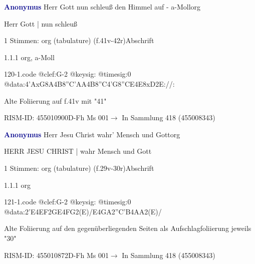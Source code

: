 \documentclass[twocolumn, 12pt]{book}
\begin{document}
\par \vspace{16pt} \textcolor{darkblue}{\textbf{Anonymus  }}\hfillplus{\textbf{[120]}}\newline Herr Gott nun schleuß den Himmel auf - a-Moll\newline org
\par \begin{itshape}[f.41v, at left:] Herr Gott | nun schleuß\end{itshape} 
\par \textcolor{darkblue}{}  1 Stimmen: org (tabulature)  (f.41v-42r)\newline Abschrift
\par 1.1.1  org, a-Moll  
\begin{filecontents*}{120-1.code}
@clef:G-2
@keysig:
@timesig:0
@data:4'AxG8A4B8''C{'AA}4B8''C4'G8''CE4E8xD2E://:
\end{filecontents*}
\newline %
\par Alte Foliierung auf f.41v mit "41"
\par RISM-ID: 455010900\newline D-Fh  Ms 001\newline $\rightarrow$ In Sammlung 418 (455008343)
      
\par \vspace{16pt} \textcolor{darkblue}{\textbf{Anonymus  }}\hfillplus{\textbf{[121]}}\newline Herr Jesu Christ wahr' Mensch und Gott\newline org
\par \begin{itshape}[f.29v, at left:] HERR JESU CHRIST | wahr Mensch und Gott\end{itshape} 
\par \textcolor{darkblue}{}  1 Stimmen: org (tabulature)  (f.29v-30r)\newline Abschrift
\par 1.1.1  org  
\begin{filecontents*}{121-1.code}
@clef:G-2
@keysig:
@timesig:0
@data:2'E4EF2GE4FG2(E)/E4GA2''C'B4AA2(E)/
\end{filecontents*}
\newline %
\par Alte Foliierung auf den gegenüberliegenden Seiten als Aufschlagfoliierung jeweils "30"
\par RISM-ID: 455010872\newline D-Fh  Ms 001\newline $\rightarrow$ In Sammlung 418 (455008343)
      
\end{document}
